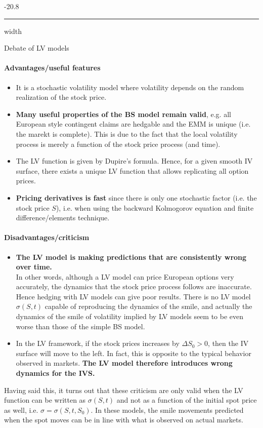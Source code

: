 \documentclass[a4paper,landscape,7pt,fleqn]{scrartcl}
\makeatletter
\renewcommand{\emph}[1]{\textbf{#1}}
\renewcommand{\subsubsection}{\@startsection{subsubsection}{1}{0mm}%
{-2\baselineskip}{0.8\baselineskip}%
{\hrule depth 0.2pt width\columnwidth\vspace*{1.2em}\normalsize\bfseries}}
\makeatother
\begin{document}
\begin{multicols*}{3}
\subsubsection{Debate of LV models}

\paragraph{Advantages/useful features}
\begin{itemize}
\item It is a stochastic volatility model where volatility depends on the random realization of the stock price.
\item \emph{Many useful properties of the BS model remain valid}, e.g. all European style contingent claims are hedgable and the EMM is unique (i.e. the marekt is complete). This is due to the fact that the local volatility process is merely a function of the stock price process (and time).
\item The LV function is given by Dupire's formula. Hence, for a given smooth IV surface, there exists a unique LV function that allows replicating all option prices.
\item \emph{Pricing derivatives is fast} since there is only one stochastic factor (i.e. the stock price $S$), i.e. when using the backward Kolmogorov equation and finite difference/elements technique.
\end{itemize}

\paragraph{Disadvantages/criticism}
\begin{itemize}
\item \emph{The LV model is making predictions that are consistently wrong over time.} \\
In other words, although a LV model can price European options very accurately, the dynamics that the stock price process follows are inaccurate. \\
Hence hedging with LV models can give poor results. There is no LV model $\sigma(S,t)$ capable of reproducing the dynamics of the smile, and actually the dynamics of the smile of volatility implied by LV models seem to be even worse than those of the simple BS model.
\item In the LV framework, if the stock prices increases by $\Delta S_0 > 0$, then the IV surface will move to the left. In fact, this is opposite to the typical behavior observed in markets. \emph{The LV model therefore introduces wrong dynamics for the IVS.}
\end{itemize}
Having said this, it turns out that these criticism are only valid when the LV function can be written as $\sigma(S,t)$ and not as a function of the initial spot price as well, i.e. $\sigma = \sigma(S,t,S_0)$. In these models, the smile movements predicted when the spot moves can be in line with what is observed on actual markets.


\end{multicols*}
\end{document}
